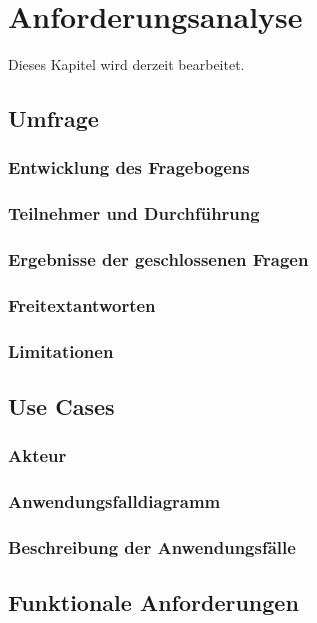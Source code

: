 \documentclass[12pt,a4paper]{scrreprt}
\begin{document}
\chapter{Anforderungsanalyse}
Dieses Kapitel wird derzeit bearbeitet.
\section{Umfrage}
\subsection{Entwicklung des Fragebogens}
\subsection{Teilnehmer und Durchführung}
\subsection{Ergebnisse der geschlossenen Fragen}
\subsection{Freitextantworten}
\subsection{Limitationen}
\section{Use Cases}
\subsection{Akteur}
\subsection{Anwendungsfalldiagramm}
\subsection{Beschreibung der Anwendungsfälle}
\section{Funktionale Anforderungen}
\end{document}
